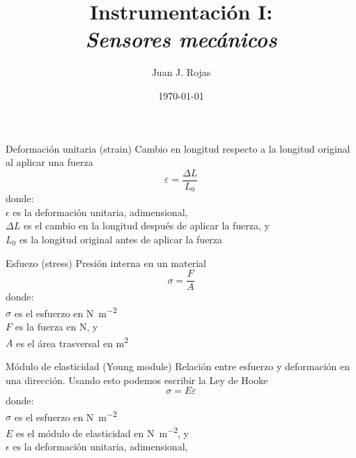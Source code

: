 \documentclass[aspectratio=169]{beamer}
\title{Instrumentación I: \\ \emph{Sensores mecánicos}}
\author{
    Juan J. Rojas
}
\institute{Instituto Tecnológico de Costa Rica}
\date{\today}
\begin{document}

\maketitle

\newcommand{\blackandwhite}{white} %

\begin{frame}[t]{Deformación unitaria (strain)}
    Cambio en longitud respecto a la longitud original al aplicar una fuerza
    \vspace{0.5cm}
    \begin{equation*}
        \varepsilon = \dfrac{\Delta L }{L_0}
    \end{equation*}
    donde:\\
    $\epsilon$ es la deformación unitaria, adimensional,\\
    $\Delta L$ es el cambio en la longitud después de aplicar la fuerza, y\\ 
    $L_0$ es la longitud original antes de aplicar la fuerza
\end{frame}

\begin{frame}[t]{Esfuezo (stress)}
    Presión interna en un material
    \vspace{0.5cm}
    \begin{equation*}
        \sigma = \dfrac{F}{A}
    \end{equation*}
    donde:\\
    $\sigma$ es el esfuerzo en \si{\newton\meter^{-2}}\\
    $F$ es la fuerza en \si{\newton}, y\\ 
    $A$ es el área trasversal en  \si{\meter^{2}}
\end{frame}

\begin{frame}[t]{Módulo de elasticidad (Young module)}
    Relación entre esfuerzo y deformación en una dirección. Usando esto podemos escribir la Ley de Hooke
    \vspace{0.5cm}
    \begin{equation*}
        \sigma = E\varepsilon
    \end{equation*}
    donde:\\
    $\sigma$ es el esfuerzo en \si{\newton\meter^{-2}}\\
    $E$ es el módulo de elasticidad en \si{\newton\meter^{-2}}, y\\ 
    $\epsilon$ es la deformación unitaria, adimensional,\\
\end{frame}
\end{document}
